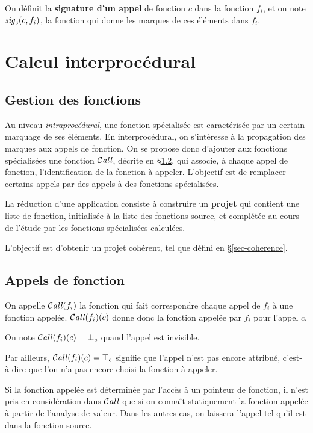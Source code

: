 On définit la {\bf signature d'un appel} de fonction $c$
dans la fonction $f_i$, et on note $\mathit{sig_c}(c, f_i)$,
la fonction qui donne les marques de ces éléments dans $f_i$.

\section{Calcul interprocédural}

\subsection{Gestion des fonctions}

Au niveau {\it intraprocédural}, une fonction spécialisée est caractérisée par
un certain marquage de ses éléments. 
En interprocédural, on s'intéresse à la propagation des marques aux appels
de fonction. On se propose donc d'ajouter aux fonctions spécialisées
une fonction $\operatorname{\mathcal{C\mathit{all}}}$, décrite en \S\ref{sec-Call}, qui associe, à chaque appel
de fonction, l'identification de la fonction à appeler.  L'objectif est de
remplacer certains appels par des appels à des fonctions spécialisées.\bb

La réduction d'une application consiste à construire un {\bf projet} qui
contient une liste de fonction, initialisée à la liste des fonctions source, et
complétée au cours de l'étude par les fonctions spécialisées calculées.

L'objectif est d'obtenir un projet cohérent, tel que défini en
\S\ref{sec-coherence}.

\subsection{Appels de fonction}\label{sec-Call}

On appelle $\operatorname{\mathcal{C\mathit{all}}}(f_i)$ la fonction qui fait correspondre
chaque appel de $f_i$ à une fonction appelée.
$\operatorname{\mathcal{C\mathit{all}}}(f_i)(c)$ donne donc la fonction appelée par $f_i$ pour l'appel $c$.\bb

On note $\operatorname{\mathcal{C\mathit{all}}}(f_i)(c) = {\bot}_c$ quand l'appel est invisible.

Par ailleurs, $\operatorname{\mathcal{C\mathit{all}}}(f_i)(c) = {\top}_c$ signifie que l'appel
n'est pas encore attribué, c'est-à-dire que l'on n'a pas encore choisi la
fonction à appeler.\bb

Si la fonction appelée est déterminée par l'accès à un pointeur de fonction,
il n'est pris en considération dans $\operatorname{\mathcal{C\mathit{all}}}$ que si on connaît
statiquement la fonction appelée à partir de l'analyse de valeur. 
Dans les autres cas, on laissera
l'appel tel qu'il est dans la fonction source.\bb


